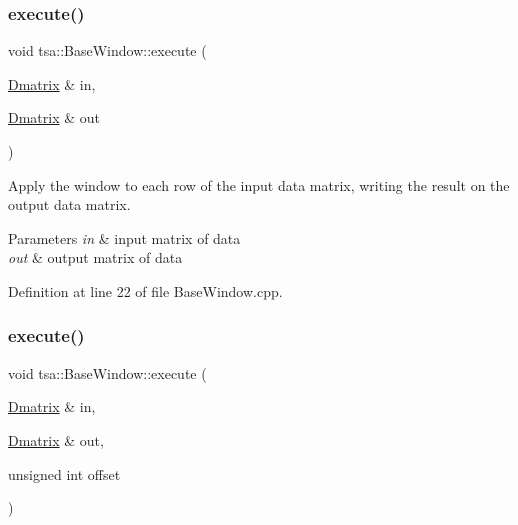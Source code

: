 \mbox{\label{classtsa_1_1_base_window_a15647cb85344c7e82ecde50675b07efd}} 
\subsubsection{\texorpdfstring{execute()}{execute()}\hspace{0.1cm}{\footnotesize\ttfamily [1/4]}}
{\footnotesize\ttfamily void tsa\+::\+Base\+Window\+::execute (\begin{DoxyParamCaption}\item[{\hyperlink{namespacetsa_ad260cd21c1891c4ed391fe788569aba4}{Dmatrix} \&}]{in,  }\item[{\hyperlink{namespacetsa_ad260cd21c1891c4ed391fe788569aba4}{Dmatrix} \&}]{out }\end{DoxyParamCaption})}

Apply the window to each row of the input data matrix, writing the result on the output data matrix.


\begin{DoxyParams}{Parameters}
{\em in} & input matrix of data \\
\hline
{\em out} & output matrix of data \\
\hline
\end{DoxyParams}


Definition at line 22 of file Base\+Window.\+cpp.

\mbox{\label{classtsa_1_1_base_window_a7e4b5f7d87bbe397332b4e506b0681c2}} 
\subsubsection{\texorpdfstring{execute()}{execute()}\hspace{0.1cm}{\footnotesize\ttfamily [2/4]}}
{\footnotesize\ttfamily void tsa\+::\+Base\+Window\+::execute (\begin{DoxyParamCaption}\item[{\hyperlink{namespacetsa_ad260cd21c1891c4ed391fe788569aba4}{Dmatrix} \&}]{in,  }\item[{\hyperlink{namespacetsa_ad260cd21c1891c4ed391fe788569aba4}{Dmatrix} \&}]{out,  }\item[{unsigned int}]{offset }\end{DoxyParamCaption})}



